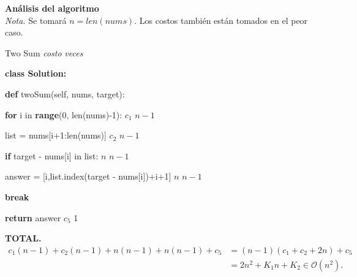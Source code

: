 \documentclass{article}
\newcommand{\bigO}{\mathcal{O}} %
\begin{document}
\textbf{Análisis del algoritmo} \\
\textit{Nota.} Se tomará $n = len(nums)$. Los costos también están tomados en el peor caso. 
\begin{algorithm}
\caption{Two Sum \hspace{5.5cm} \textit{costo} \hspace{0.5cm} \textit{veces}}\label{Primer algoritmo}
\begin{algorithmic}
\item \textbf{class Solution:} 
    \item \hspace{0.3cm} \textbf{def} twoSum(self, nums, target): 
    \item \hspace{0.7cm} \textbf{for} i in \textbf{range}(0, len(nums)-1):  \hspace{3.6cm}  $c_1$ \hspace{1cm} $n-1$
    \item \hspace{1.2cm} list = nums[i+1:len(nums)] \hspace{3.7cm} $c_2$ \hspace{1cm} $n-1$
                \item \hspace{1.2cm} \textbf{if} target - nums[i] in list: \hspace{4.05cm} $n$ \hspace{1.1cm} $n-1$ 
                    \item \hspace{1.5cm} answer = [i,list.index(target - nums[i])+i+1] \hspace{0.77cm} $n$ \hspace{1.1cm} $n-1$
                    \item \hspace{1.5cm} \textbf{break}
            \item \hspace{0.7cm} \textbf{return} answer 
\hspace{6.1cm} $c_5$ \hspace{1.3cm} 1 \\
\end{algorithmic}
\end{algorithm} 

\textbf{TOTAL.}
\begin{align*}
    c_1(n-1) + c_2(n-1) + n(n-1) + n(n-1) + c_5 &= (n-1)(c_1+c_2+2n) + c_5 \\
    &= 2n^2 + K_1n + K_2 \in \bigO(n^2).  \\
\end{align*}
\end{document}
